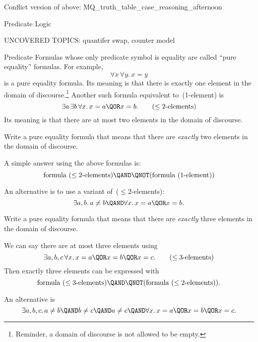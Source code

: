\documentclass[quiz]{mcs}
\begin{document}

Conflict version of above: MQ\_truth\_table\_case\_reasoning\_afternoon

\examspace

\begin{center}
{\large Predicate Logic}
\end{center}

UNCOVERED TOPICS: quantifer swap, counter model

\begin{problem}[points = 6, title= \textbf{Predicate Formulas}]
Predicate Formulas whose only predicate symbol is equality are called
``pure equality'' formulas.  For example,
\begin{equation}
\forall x\, \forall y.\, x = y\tag{1-element}
\end{equation}
is a pure equality formula.  Its meaning is that there is exactly one
element in the domain of discourse.\footnote{Reminder, a domain of
  discourse is not allowed to be empty.}  Another such formula
equivalent to~(1-element) is
\begin{equation}
\exists a\, \exists b\, \forall x.\, x=a \QOR x = b. \tag{$\leq 2$-elements}
\end{equation}
Its meaning is that there are at most two elements in the domain of
discourse.

\bparts

\ppart Write a pure equality formula that means that there are
\emph{exactly} two elements in the domain of discourse.

\examspace[2.0in]

\begin{solution}
A simple answer using the above formulas is:
\[
\text{formula~($\leq 2$-elements)} \QAND \QNOT(\text{formula~(1-element)})
\]

An alternative is to use a variant of~($\leq 2$-elements):
\[
\exists a,b.\, a \neq b \QAND \forall x.\, x=a \QOR x = b.
\]
\end{solution}

\ppart Write a pure equality formula that means that there are
\emph{exactly} three elements in the domain of discourse.

\examspace[2.0in]

\begin{solution}
We can say there are at most three elements using
\begin{equation}
\exists a,b,c\, \forall x.\, x=a \QOR x = b \QOR x =c.\tag{$\leq 3$-elements}
\end{equation}
Then  exactly three elements can be expressed with
\[
\text{formula~($\leq 3$-elements)} \QAND 
\QNOT(\text{formula~($\leq 2$-elements)}).
\]

An alternative is
\[
\exists a,b,c.\, a \neq b \QAND b \neq c \QAND a \neq c \QAND \forall
x.\, x=a \QOR x = b \QOR x = c.
\]
\end{solution}
\eparts

\end{problem}
\end{document}
